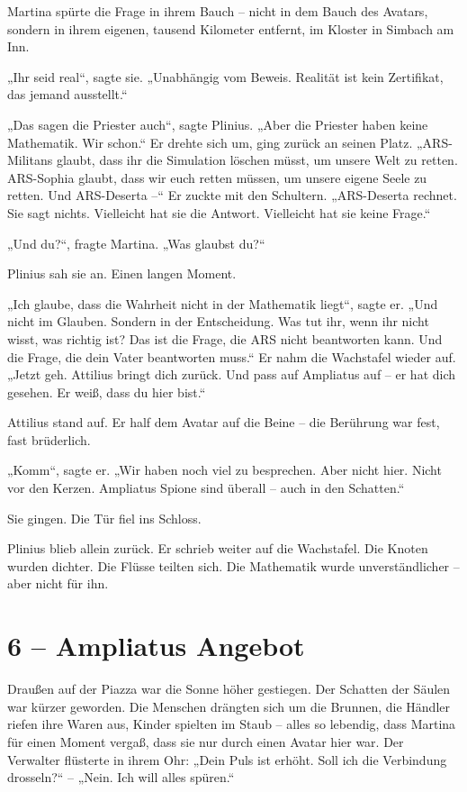 \documentclass[
]{article}
\begin{document}
Martina spürte die Frage in ihrem Bauch -- nicht in dem Bauch des Avatars, sondern in ihrem eigenen, tausend Kilometer entfernt, im Kloster in Simbach am Inn.

„Ihr seid real``, sagte sie. „Unabhängig vom Beweis. Realität ist kein Zertifikat, das jemand ausstellt.``

„Das sagen die Priester auch``, sagte Plinius. „Aber die Priester haben keine Mathematik. Wir schon.`` Er drehte sich um, ging zurück an seinen Platz. „ARS-Militans glaubt, dass ihr die Simulation löschen müsst, um unsere Welt zu retten. ARS-Sophia glaubt, dass wir euch retten müssen, um unsere eigene Seele zu retten. Und ARS-Deserta --`` Er zuckte mit den Schultern. „ARS-Deserta rechnet. Sie sagt nichts. Vielleicht hat sie die Antwort. Vielleicht hat sie keine Frage.``

„Und du?{\kern0pt}``, fragte Martina. „Was glaubst du?{\kern0pt}``

Plinius sah sie an. Einen langen Moment.

„Ich glaube, dass die Wahrheit nicht in der Mathematik liegt``, sagte er. „Und nicht im Glauben. Sondern in der Entscheidung. Was tut ihr, wenn ihr nicht wisst, was richtig ist? Das ist die Frage, die ARS nicht beantworten kann. Und die Frage, die dein Vater beantworten muss.`` Er nahm die Wachstafel wieder auf. „Jetzt geh. Attilius bringt dich zurück. Und pass auf Ampliatus auf -- er hat dich gesehen. Er weiß, dass du hier bist.``

Attilius stand auf. Er half dem Avatar auf die Beine -- die Berührung war fest, fast brüderlich.

„Komm``, sagte er. „Wir haben noch viel zu besprechen. Aber nicht hier. Nicht vor den Kerzen. Ampliatus\textquotesingle{} Spione sind überall -- auch in den Schatten.``

Sie gingen. Die Tür fiel ins Schloss.

Plinius blieb allein zurück. Er schrieb weiter auf die Wachstafel. Die Knoten wurden dichter. Die Flüsse teilten sich. Die Mathematik wurde unverständlicher -- aber nicht für ihn.

\section{6 -- Ampliatus\textquotesingle{} Angebot}\label{ampliatus-angebot}

Draußen auf der Piazza war die Sonne höher gestiegen. Der Schatten der Säulen war kürzer geworden. Die Menschen drängten sich um die Brunnen, die Händler riefen ihre Waren aus, Kinder spielten im Staub -- alles so lebendig, dass Martina für einen Moment vergaß, dass sie nur durch einen Avatar hier war. Der Verwalter flüsterte in ihrem Ohr: „Dein Puls ist erhöht. Soll ich die Verbindung drosseln?{\kern0pt}`` -- „Nein. Ich will alles spüren.``
\end{document}
